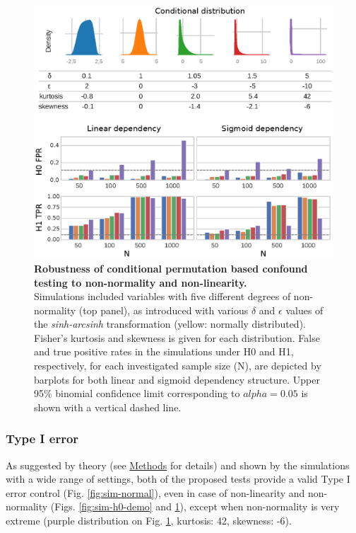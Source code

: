 \documentclass{article}
\begin{document}
\begin{figure}[!b]
  \centering

  \includegraphics[width=0.5\paperwidth]{fig/sim_non-norm.eps}
  \caption{\textbf{Robustness of conditional permutation based confound testing to non-normality and non-linearity.} \\
  Simulations included variables with five different degrees of non-normality (top panel), as introduced with various $\delta$ and $\epsilon$ values of the \emph{sinh-arcsinh} transformation (yellow: normally distributed). Fisher's kurtosis and skewness is given for each distribution. False and true positive rates in the simulations under H0 and H1, respectively, for each investigated sample size (N), are depicted by barplots for both linear and sigmoid dependency structure. Upper 95\% binomial confidence limit corresponding to $alpha=0.05$ is shown with a vertical dashed line.}
  \label{fig:sim-non-normal}
\end{figure}

\subsubsection*{Type I error}

As suggested by theory (see \hyperref[sec:methods]{Methods} for details) and shown by the simulations with a wide range of settings, both of the proposed tests provide a valid Type I error control (Fig. \ref{fig:sim-normal}), even in case of non-linearity and non-normality (Figs. \ref{fig:sim-h0-demo} and \ref{fig:sim-non-normal}), except when non-normality is very extreme (purple distribution on Fig. \ref{fig:sim-non-normal}, kurtosis: 42, skewness: -6).
\end{document}

